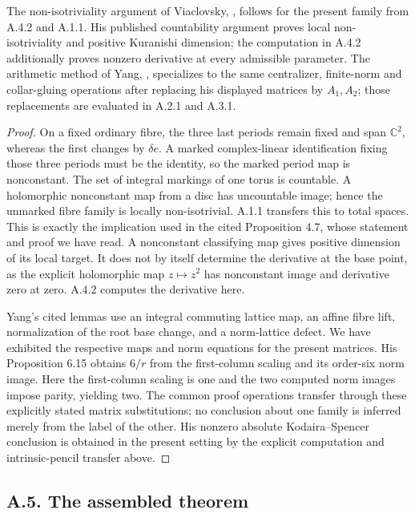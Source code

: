 \begin{proposition}\label{fam:src:A.4.3}\label{fam:st:A.4.3}
The non-isotriviality argument of Viaclovsky, \cite[Proposition 4.7]{VL26}, follows for the present family from A.4.2 and A.1.1. His published countability argument proves local non-isotriviality and positive Kuranishi dimension; the computation in A.4.2 additionally proves nonzero derivative at every admissible parameter. The arithmetic method of Yang, \cite[Lemmas 6.6--6.9 and Proposition 6.15]{Y26}, specializes to the same centralizer, finite-norm and collar-gluing operations after replacing his displayed matrices by $A_1,A_2$; those replacements are evaluated in A.2.1 and A.3.1.
\end{proposition}
\begin{proof}
On a fixed ordinary fibre, the three last periods remain fixed and span $\mathbb C^2$, whereas the first changes by $\delta e$. A marked complex-linear identification fixing those three periods must be the identity, so the marked period map is nonconstant. The set of integral markings of one torus is countable. A holomorphic nonconstant map from a disc has uncountable image; hence the unmarked fibre family is locally non-isotrivial. A.1.1 transfers this to total spaces. This is exactly the implication used in the cited Proposition 4.7, whose statement and proof we have read. A nonconstant classifying map gives positive dimension of its local target. It does not by itself determine the derivative at the base point, as the explicit holomorphic map $z\mapsto z^2$ has nonconstant image and derivative zero at zero. A.4.2 computes the derivative here.

Yang's cited lemmas use an integral commuting lattice map, an affine fibre lift, normalization of the root base change, and a norm-lattice defect. We have exhibited the respective maps and norm equations for the present matrices. His Proposition 6.15 obtains $6/r$ from the first-column scaling and its order-six norm image. Here the first-column scaling is one and the two computed norm images impose parity, yielding two. The common proof operations transfer through these explicitly stated matrix substitutions; no conclusion about one family is inferred merely from the label of the other. His nonzero absolute Kodaira--Spencer conclusion is obtained in the present setting by the explicit computation and intrinsic-pencil transfer above.
\end{proof}

\subsection{A.5. The assembled theorem}

